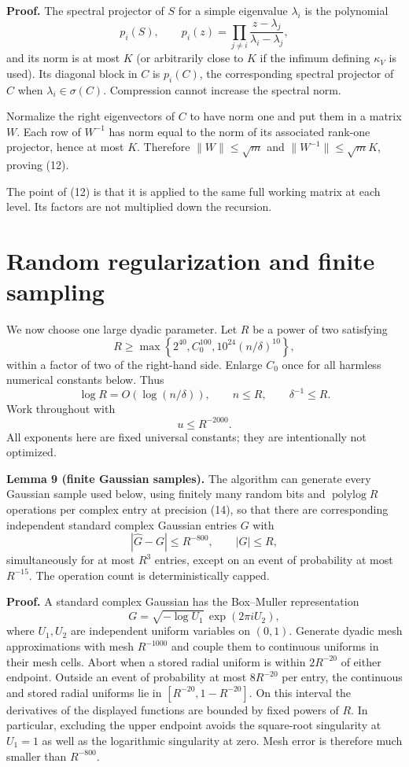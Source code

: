 \documentclass[10pt,a4paper]{article}
\begin{document}
\textbf{Proof.} The spectral projector of \(S\) for a simple eigenvalue
\(\lambda_i\) is the polynomial \[
 p_i(S),\qquad
 p_i(z)=\prod_{j\ne i}\frac{z-\lambda_j}{\lambda_i-\lambda_j},
\] and its norm is at most \(K\) (or arbitrarily close to \(K\) if the
infimum defining \(\kappa_V\) is used). Its diagonal block in \(C\) is
\(p_i(C)\), the corresponding spectral projector of \(C\) when
\(\lambda_i\in\sigma(C)\). Compression cannot increase the spectral
norm.

Normalize the right eigenvectors of \(C\) to have norm one and put them
in a matrix \(W\). Each row of \(W^{-1}\) has norm equal to the norm of
its associated rank-one projector, hence at most \(K\). Therefore
\(\|W\|\le\sqrt m\) and \(\|W^{-1}\|\le\sqrt mK\), proving (12).

The point of (12) is that it is applied to the same full working matrix
at each level. Its factors are not multiplied down the recursion.

\section{Random regularization and finite
sampling}\label{random-regularization-and-finite-sampling}

We now choose one large dyadic parameter. Let \(R\) be a power of two
satisfying \[
 R\ge\max\left\{2^{40},C_0^{100},10^{24}(n/\delta)^{10}\right\},
 \tag{13}
\] within a factor of two of the right-hand side. Enlarge \(C_0\) once
for all harmless numerical constants below. Thus \[
 \log R=O(\log(n/\delta)),\qquad n\le R,\qquad\delta^{-1}\le R.
\] Work throughout with \[
 u\le R^{-2000}.
 \tag{14}
\] All exponents here are fixed universal constants; they are
intentionally not optimized.

\textbf{Lemma 9 (finite Gaussian samples).} The algorithm can generate
every Gaussian sample used below, using finitely many random bits and
\(\operatorname{polylog}R\) operations per complex entry at precision
(14), so that there are corresponding independent standard complex
Gaussian entries \(G\) with \[
 |\widehat G-G|\le R^{-800},\qquad |G|\le R,
 \tag{15}
\] simultaneously for at most \(R^3\) entries, except on an event of
probability at most \(R^{-15}\). The operation count is
deterministically capped.

\textbf{Proof.} A standard complex Gaussian has the Box--Muller
representation \[
 G=\sqrt{-\log U_1}\,\exp(2\pi iU_2),
\] where \(U_1,U_2\) are independent uniform variables on \((0,1)\).
Generate dyadic mesh approximations with mesh \(R^{-1000}\) and couple
them to continuous uniforms in their mesh cells. Abort when a stored
radial uniform is within \(2R^{-20}\) of either endpoint. Outside an
event of probability at most \(8R^{-20}\) per entry, the continuous and
stored radial uniforms lie in \([R^{-20},1-R^{-20}]\). On this interval
the derivatives of the displayed functions are bounded by fixed powers
of \(R\). In particular, excluding the upper endpoint avoids the
square-root singularity at \(U_1=1\) as well as the logarithmic
singularity at zero. Mesh error is therefore much smaller than
\(R^{-800}\).
\end{document}
